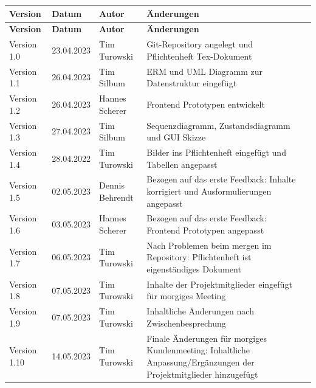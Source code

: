 \begin{flushleft}
		\begin{longtable}{p{}p{2cm}p{3cm}p{}c}
            \toprule
            \textbf{Version} & \textbf{Datum} & \textbf{Autor} & \textbf{Änderungen}\\
            \midrule\endfirsthead
            \toprule
            \textbf{Version} & \textbf{Datum} & \textbf{Autor} & \textbf{Änderungen}\\
            \midrule\endhead
            	Version 1.0 & 23.04.2023 & Tim Turowski & Git-Repository angelegt und Pflichtenheft Tex-Dokument \\ \midrule
				Version 1.1 & 26.04.2023 & Tim Silbum & ERM und UML Diagramm zur Datenstruktur eingefügt \\ \midrule
				Version 1.2 & 26.04.2023 & Hannes Scherer & Frontend Prototypen entwickelt \\ \midrule
				Version 1.3 & 27.04.2023 & Tim Silbum & Sequenzdiagramm, Zustandsdiagramm und GUI Skizze \\ \midrule
 				Version 1.4 & 28.04.2022 & Tim Turowski & Bilder ins Pflichtenheft eingefügt und Tabellen angepasst \\ \midrule
				Version 1.5 & 02.05.2023 & Dennis Behrendt & Bezogen auf das erste Feedback: Inhalte korrigiert und Ausformulierungen angepasst \\ \midrule
				Version 1.6 & 03.05.2023 & Hannes Scherer & Bezogen auf das erste Feedback: Frontend Prototypen angepasst \\ \midrule
				Version 1.7 & 06.05.2023 & Tim Turowski & Nach Problemen beim mergen im Repository: Pflichtenheft ist eigenständiges Dokument \\ \midrule
				Version 1.8 & 07.05.2023 & Tim Turowski & Inhalte der Projektmitglieder eingefügt für morgiges Meeting \\ \midrule
				Version 1.9 & 07.05.2023 & Tim Turowski & Inhaltliche Änderungen nach Zwischenbesprechung \\ \midrule
				Version 1.10 & 14.05.2023 & Tim Turowski & Finale Änderungen für morgiges Kundenmeeting: Inhaltliche Anpassung/Ergänzungen der Projektmitglieder hinzugefügt \\ 
            \bottomrule
    \end{longtable}

\end{flushleft}

\newpage


